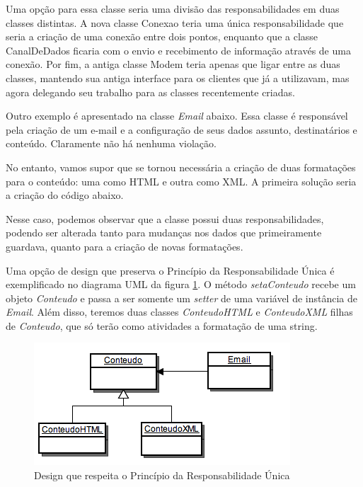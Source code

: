 Uma opção para essa classe seria uma divisão das responsabilidades em duas classes distintas. A nova classe 
Conexao teria uma única responsabilidade que seria a criação de uma conexão entre dois pontos, enquanto que a 
classe CanalDeDados ficaria com o envio e recebimento de informação através de uma conexão. Por fim, a antiga 
classe Modem teria apenas que ligar entre as duas classes, mantendo sua antiga interface para os clientes que 
já a utilizavam, mas agora delegando seu trabalho para as classes recentemente criadas.

Outro exemplo é apresentado na classe \textit{Email} abaixo. Essa classe é responsável pela criação de um 
e-mail e a configuração de seus dados assunto, destinatários e conteúdo. Claramente não há nenhuma violação.



No entanto, vamos supor que se tornou necessária a criação de duas formatações para o conteúdo: uma como HTML e 
outra como XML. A primeira solução seria a criação do código abaixo.



Nesse caso, podemos observar que a classe possui duas responsabilidades, podendo ser alterada tanto para 
mudanças nos dados que primeiramente guardava, quanto para a criação de novas formatações.

Uma opção de design que preserva o Princípio da Responsabilidade Única é exemplificado no diagrama UML da figura \ref{img:email}.
O método \textit{setaConteudo} recebe um objeto \textit{Conteudo} e passa a ser somente um \textit{setter} de uma variável de instância de \textit{Email}. Além disso, teremos duas classes \textit{ConteudoHTML} e \textit{ConteudoXML} filhas de \textit{Conteudo}, que só terão como atividades a formatação de uma string.

\begin{figure}[!t]
\begin{centering}
\includegraphics[scale=0.7]{imagens/email.png}
\par\end{centering}

\caption{Design que respeita o Princípio da Responsabilidade Única \label{img:email}}

\end{figure}


